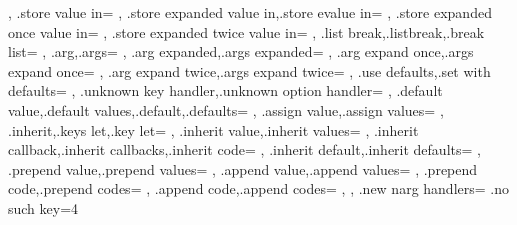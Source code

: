 {{{      
    },
    .store value in={
    },
    {.store expanded value in,.store evalue in}={
    },
    .store expanded once value in={
    },
    .store expanded twice value in={
    },
    {.list break,.listbreak,.break list}={
      \skvbreaklooptrue
    },
    {.arg,.args}={
    },
    {.arg expanded,.args expanded}={
    },
    {.arg expand once,.args expand once}={
    },
    {.arg expand twice,.args expand twice}={
    },
    {.use defaults,.set with defaults}={
      \dirkeys@setwithdefaults
    },
    {.unknown key handler,.unknown option handler}={
    },
    {.default value,.default values,.default,.defaults}={
    },
    {.assign value,.assign values}={
    },
    {.inherit,.keys let,.key let}={
    },
    {.inherit value,.inherit values}={
    },
    {.inherit callback,.inherit callbacks,.inherit code}={
    },
    {.inherit default,.inherit defaults}={
    },
    {.prepend value,.prepend values}={
    },
    {.append value,.append values}={
    },
    {.prepend code,.prepend codes}={
    },
    {.append code,.append codes}={
    },
  },
  .new narg handlers={
    .no such key={4}{
      }}}
